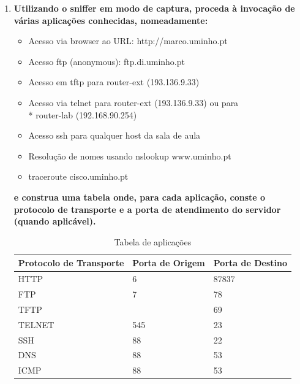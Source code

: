 \documentclass{llncs}
\begin{document}
\begin{enumerate}[\textbf{b)}]
  \item \textbf{Utilizando o sniffer em modo de captura, proceda à invocação de várias aplicações conhecidas, nomeadamente:}
  \vspace{5mm}
  \begin{itemize}
      \item Acesso via browser ao URL: http://marco.uminho.pt
      \item Acesso ftp (anonymous): ftp.di.uminho.pt
      \item Acesso em tftp para router-ext (193.136.9.33)
      \item Acesso via telnet para router-ext (193.136.9.33) ou para\\*
      router-lab (192.168.90.254)
      \item Acesso ssh para qualquer host da sala de aula
      \item Resolução de nomes usando nslookup www.uminho.pt
      \item traceroute cisco.uminho.pt
  \end{itemize}
  \par \textbf{e construa uma tabela onde, para cada aplicação, conste o protocolo de transporte e a porta de atendimento do
  servidor (quando aplicável).}
  
  \vspace{5mm}
   
  \begin{table}[h!]
    \centering
    \begin{tabular}{p{4.4cm}  p{3cm}  p{3cm}} 
     \hline
     \textbf{Protocolo de Transporte} & \textbf{Porta de Origem} & \textbf{Porta de Destino}\\ [1ex] 
     \hline\hline
     HTTP & 6 & 87837 \\ [1ex]
     FTP & 7 & 78 \\ [1ex]
     TFTP &  & 69 \\ [1ex]
     TELNET & 545 & 23 \\ [1ex]
     SSH & 88 & 22 \\ [1ex]
     DNS & 88 & 53 \\ [1ex]
     ICMP & 88 & 53 \\ [1ex] 
     \hline
    \end{tabular}
    \caption{Tabela de aplicações}
    \label{table:1}
    \end{table}


\end{enumerate}
\end{document}
